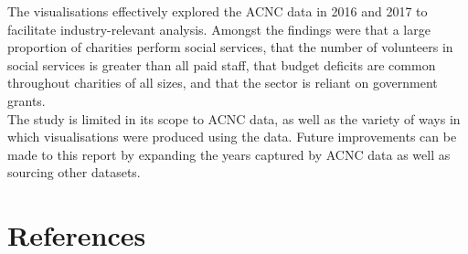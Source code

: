 \documentclass[
  11pt,
]{article}
\begin{document}
The visualisations effectively explored the ACNC data in 2016 and 2017 to facilitate industry-relevant analysis. Amongst the findings were that a large proportion of charities perform social services, that the number of volunteers in social services is greater than all paid staff, that budget deficits are common throughout charities of all sizes, and that the sector is reliant on government grants.\\
The study is limited in its scope to ACNC data, as well as the variety of ways in which visualisations were produced using the data. Future improvements can be made to this report by expanding the years captured by ACNC data as well as sourcing other datasets.

\newpage
{}
\onecolumn

\hypertarget{references}{%
\section{References}\label{references}}

\fontsize{11}{14}
\end{document}
